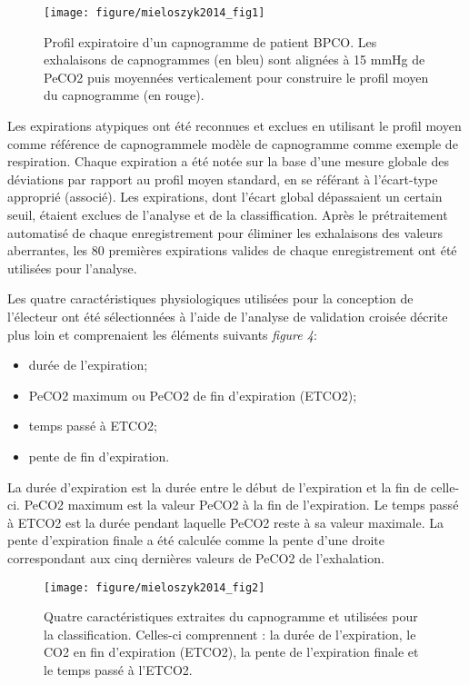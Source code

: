 \documentclass[12pt,]{article}
\providecommand{\tightlist}{%
  \setlength{\itemsep}{0pt}\setlength{\parskip}{0pt}}
\begin{document}
\begin{figure}[h!]

{\centering \texttt{[image: figure/mieloszyk2014\_fig1]} 

}

\caption{Profil expiratoire d'un capnogramme de patient BPCO. Les exhalaisons de capnogrammes (en bleu) sont alignées à 15 mmHg de PeCO2 puis moyennées verticalement pour construire le profil moyen du capnogramme (en rouge).}\label{fig:unnamed-chunk-4}
\end{figure}

Les expirations atypiques ont été reconnues et exclues en utilisant le
profil moyen comme référence de capnogrammele modèle de capnogramme
comme exemple de respiration. Chaque expiration a été notée sur la base
d'une mesure globale des déviations par rapport au profil moyen
standard, en se référant à l'écart-type approprié (associé). Les
expirations, dont l'écart global dépassaient un certain seuil, étaient
exclues de l'analyse et de la classiffication. Après le prétraitement
automatisé de chaque enregistrement pour éliminer les exhalaisons des
valeurs aberrantes, les 80 premières expirations valides de chaque
enregistrement ont été utilisées pour l'analyse.

Les quatre caractéristiques physiologiques utilisées pour la conception
de l'électeur ont été sélectionnées à l'aide de l'analyse de validation
croisée décrite plus loin et comprenaient les éléments suivants
\emph{figure 4}:

\begin{itemize}
\tightlist
\item
  durée de l'expiration;
\item
  PeCO2 maximum ou PeCO2 de fin d'expiration (ETCO2);
\item
  temps passé à ETCO2;
\item
  pente de fin d'expiration.
\end{itemize}

La durée d'expiration est la durée entre le début de l'expiration et la
fin de celle-ci. PeCO2 maximum est la valeur PeCO2 à la fin de
l'expiration. Le temps passé à ETCO2 est la durée pendant laquelle PeCO2
reste à sa valeur maximale. La pente d'expiration finale a été calculée
comme la pente d'une droite correspondant aux cinq dernières valeurs de
PeCO2 de l'exhalation.

\begin{figure}[h!]

{\centering \texttt{[image: figure/mieloszyk2014\_fig2]} 

}

\caption{Quatre caractéristiques extraites du capnogramme et utilisées pour la classification. Celles-ci comprennent : la durée de l'expiration, le CO2 en fin d'expiration (ETCO2), la pente de l'expiration finale et le temps passé à l'ETCO2.}\label{fig:unnamed-chunk-5}
\end{figure}
\end{document}
